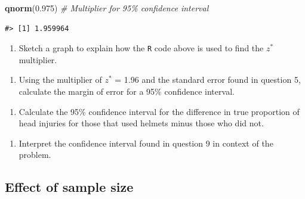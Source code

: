 \documentclass[
]{report}
\newenvironment{Shaded}{\begin{snugshade}}{\end{snugshade}}
\newcommand{\CommentTok}[1]{\textcolor[rgb]{0.56,0.35,0.01}{\textit{#1}}}
\newcommand{\FloatTok}[1]{\textcolor[rgb]{0.00,0.00,0.81}{#1}}
\newcommand{\KeywordTok}[1]{\textcolor[rgb]{0.13,0.29,0.53}{\textbf{#1}}}
\newcommand{\NormalTok}[1]{#1}
\providecommand{\tightlist}{%
  \setlength{\itemsep}{0pt}\setlength{\parskip}{0pt}}
\begin{document}
\begin{Shaded}
\begin{Highlighting}[]
\KeywordTok{qnorm}\NormalTok{(}\FloatTok{0.975}\NormalTok{) }\CommentTok{\# Multiplier for 95\% confidence interval}
\end{Highlighting}
\end{Shaded}

\begin{verbatim}
#> [1] 1.959964
\end{verbatim}

\begin{enumerate}
\def\labelenumi{\arabic{enumi}.}
\setcounter{enumi}{6}
\tightlist
\item
  Sketch a graph to explain how the \texttt{R} code above is used to find the \(z^*\) multiplier.
\end{enumerate}

\vspace{1.5in}

\begin{enumerate}
\def\labelenumi{\arabic{enumi}.}
\setcounter{enumi}{7}
\tightlist
\item
  Using the multiplier of \(z^*\) = 1.96 and the standard error found in question 5, calculate the margin of error for a 95\% confidence interval.
\end{enumerate}

\vspace{0.5in}

\begin{enumerate}
\def\labelenumi{\arabic{enumi}.}
\setcounter{enumi}{8}
\tightlist
\item
  Calculate the 95\% confidence interval for the difference in true proportion of head injuries for those that used helmets minus those who did not.
\end{enumerate}

\vspace{1in}

\begin{enumerate}
\def\labelenumi{\arabic{enumi}.}
\setcounter{enumi}{9}
\tightlist
\item
  Interpret the confidence interval found in question 9 in context of the problem.
\end{enumerate}

\vspace{1in}

\hypertarget{effect-of-sample-size}{%
\subsection{Effect of sample size}\label{effect-of-sample-size}}
\end{document}
